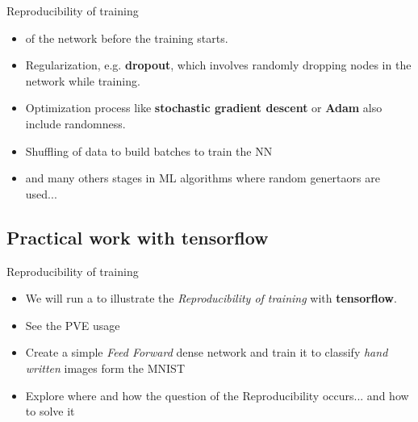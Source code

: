 \documentclass[10pt,serif,mathserif,compress,hyperref={colorlinks}]{beamer}
\begin{document}
\begin{frame}{Reproducibility of training}
  
  \begin{tcolorbox}[title=Where to find randomness in NN training]
    
    \begin{itemize}
    \item<1->  of the network before the training starts.
    \item<2-> Regularization, e.g. {\bf dropout}, which involves randomly dropping nodes in the network while training.
    \item<3-> Optimization process like {\bf stochastic gradient descent} or {\bf Adam} also include randomness.
    \item<4-> Shuffling of data to build batches to train the NN
    \item<5-> and many others stages in ML algorithms  where random genertaors are used...
    \end{itemize}
  \end{tcolorbox}
    
\end{frame}
 
\subsection{Practical work with tensorflow}

\begin{frame}{Reproducibility of training}
  
  \begin{tcolorbox}[title=Practical work with tensorflow]
    
    \begin{itemize}
    \item<1-> We will run a  to illustrate the {\it Reproducibility of training} with {\bf tensorflow}.
    \item<2-> See the PVE usage
    \item<3-> Create a simple {\it Feed Forward} dense network and train it to classify {\it hand written} images form the MNIST
    \item<4-> Explore where and how the question of the Reproducibility occurs... and how to solve it 
    \end{itemize}
  \end{tcolorbox}

    
\end{frame}
 
\end{document}
